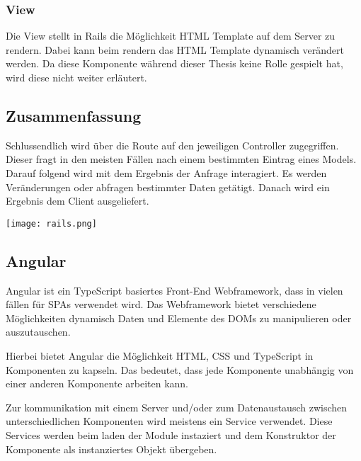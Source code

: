 \documentclass[11pt]{article}
\newcommand{\hlnote}[2]{#1}
\newcommand{\hlnote}[2]{\todo{#2}\texthl{#1}}
\begin{document}
\begin{flushleft}

			\subsubsection{View}
			\label{sec: rails_view}
			Die View stellt in Rails die Möglichkeit HTML Template auf dem Server zu rendern. Dabei kann beim rendern das HTML Template dynamisch verändert werden. Da diese Komponente während dieser Thesis keine Rolle gespielt hat, wird diese nicht weiter erläutert.\par\bigskip

			\subsection{Zusammenfassung}
			\label{sec: rails_resuemee}
			Schlussendlich wird über die Route auf den jeweiligen Controller zugegriffen. Dieser fragt in den meisten Fällen nach einem bestimmten Eintrag eines Models. Darauf folgend wird mit dem Ergebnis der Anfrage interagiert. Es werden Veränderungen oder abfragen bestimmter Daten getätigt. Danach wird ein Ergebnis dem Client ausgeliefert.






			\begin{center}
				\texttt{[image: rails.png]}
			\end{center}

			\subsection{Angular}
			\label{sec: angular}
			Angular ist ein TypeScript basiertes Front-End Webframework, dass in vielen fällen für SPAs verwendet wird. Das Webframework bietet verschiedene Möglichkeiten dynamisch Daten und Elemente des DOMs zu manipulieren oder auszutauschen.\par\bigskip

			Hierbei bietet Angular die Möglichkeit HTML, CSS und TypeScript in Komponenten zu kapseln. Das bedeutet, dass jede Komponente unabhängig von einer anderen Komponente arbeiten kann.\par\bigskip

			Zur kommunikation mit einem Server und/oder zum Datenaustausch zwischen unterschiedlichen Komponenten wird \hlnote{meistens}{Weasel, wann nicht?} ein Service verwendet. Diese Services werden beim laden der Module instaziert und dem Konstruktor der Komponente als instanziertes Objekt übergeben.\par\bigskip


\end{flushleft}
\end{document}
